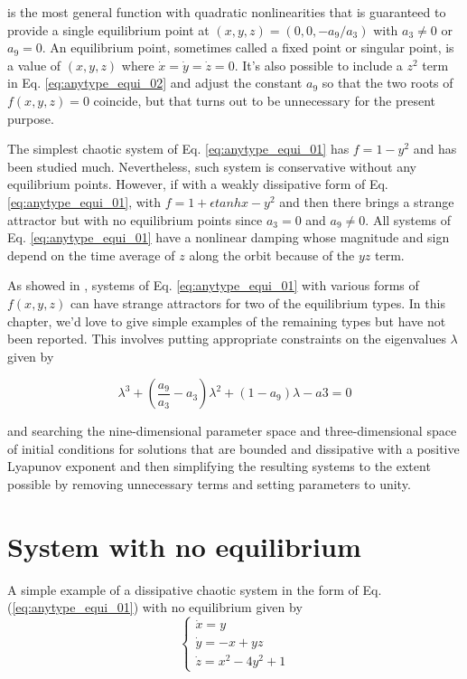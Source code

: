 is the most general function with quadratic nonlinearities that is guaranteed
to provide a single equilibrium point at $(x, y, z) = (0, 0, −a_9/a_3)$ with
$a_3 \neq 0$ or $a_9 = 0$. An equilibrium point, sometimes called a fixed point or singular point, is a
value of $(x, y, z)$ where $\dot{x} = \dot{y} = \dot{z} = 0$. It's also possible
to include a $z^2$ term in Eq. \ref{eq:anytype_equi_02} and adjust the constant
$a_9$ so that the two roots of $f(x, y, z)=0$
coincide, but that turns out to be unnecessary for the present purpose.

The simplest chaotic system of Eq. \ref{eq:anytype_equi_01} has $f = 1 − y^2$
and has been studied much. Nevertheless, such system is conservative without
any equilibrium points. However, if with a weakly dissipative form of Eq. \ref{eq:anytype_equi_01},
with $f = 1+\epsilon{}tanh x − y^2$ and then there brings a strange attractor
but with no equilibrium points since $a_3 = 0$ and $a_9 \neq 0$. All systems
of Eq. \ref{eq:anytype_equi_01} have a nonlinear damping whose magnitude
and sign depend on the time average of $z$ along the orbit because of the $yz$ term.

As showed in \cite{molaie2013simple,sprott2015chaotic}, systems of Eq. \ref{eq:anytype_equi_01}
with various forms of $f(x,y,z)$ can have strange attractors for two of
the equilibrium types. In this chapter, we'd love to give simple examples
of the remaining types but have not been reported.
This involves putting appropriate constraints on the eigenvalues $\lambda$ given by

\begin{equation}
  \label{eq:anytype_equi_03}
  \lambda^3 +\left( \frac{a_9}{a_3}−a_3 \right)\lambda^2 + (1 − a_9)λ − a3 = 0
\end{equation}

and searching the nine-dimensional parameter space and three-dimensional space
of initial conditions for solutions that are bounded and dissipative with a positive
Lyapunov exponent and then simplifying the resulting systems to the extent possible
by removing unnecessary terms and setting parameters to unity.

\section{System with no equilibrium}

A simple example of a dissipative chaotic system in the form of Eq. (\ref{eq:anytype_equi_01})
with no equilibrium given by
\begin{equation}
\label{eq:anytype_equi_04}
\left\{
    \begin{array}{l}
      \dot{x} = y \\
      \dot{y} = -x+yz \\
      \dot{z} = x^2-4y^2+1
    \end{array}
  \right.
\end{equation}

